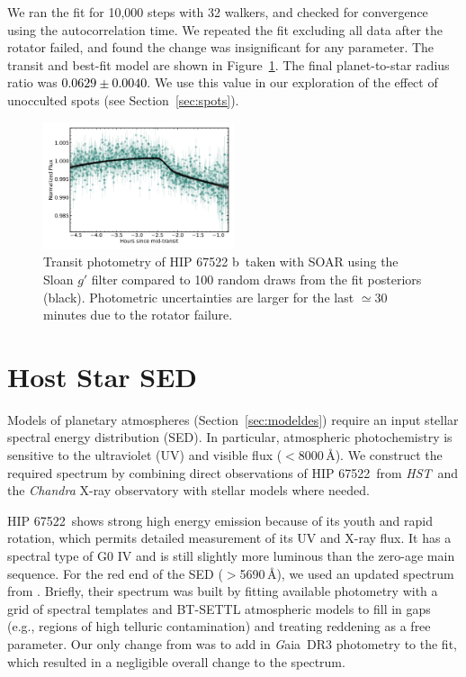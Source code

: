 \documentclass[twocolumn]{aastex63} %
\newcommand{\gaia}{{\textit Gaia}}
\newcommand{\hst}{\textit{HST}}
\newcommand{\plname}{HIP 67522 b}
\newcommand{\starname}{HIP 67522}
\newcommand{\newedit}[1]{\textcolor{black}{#1}}
\begin{document}
We ran the fit for 10,000 steps with 32 walkers, and checked for convergence using the autocorrelation time. We repeated the fit excluding all data after the rotator failed, and found the change was insignificant for any parameter. The transit and best-fit model are shown in Figure~\ref{fig:gtransit}. The final planet-to-star radius ratio was \newedit{$0.0629\pm0.0040$}. We use this value in our exploration of the effect of unocculted spots (see Section~\ref{sec:spots}).

\begin{figure}[ht]
    \centering
    \includegraphics[width=0.50\textwidth]{SOAR_gptransit.pdf}
    \caption{Transit photometry of \plname\, taken with SOAR using the Sloan $g'$ filter compared to 100 random draws from the fit posteriors (black). Photometric uncertainties are larger for the last $\simeq$30\,minutes due to the rotator failure. 
    \label{fig:gtransit}}
\end{figure} 

\section{Host Star SED} \label{sec:sed} 

Models of planetary atmospheres (Section~\ref{sec:modeldes}) require an input stellar spectral energy distribution (SED). In particular, atmospheric photochemistry is sensitive to the ultraviolet (UV) and visible flux ($<8000$\,\AA). We construct the required spectrum by combining direct observations of \starname\ from \hst\ and the \textit{Chandra} X-ray observatory with stellar models where needed. 

\starname\ shows strong high energy emission because of its youth and rapid rotation, which permits detailed measurement of its UV and X-ray flux. It has a spectral type of G0 IV and is still slightly more luminous than the zero-age main sequence. For the red end of the SED ($>$5690\,\AA), we used an updated spectrum from \citet{Rizzuto2020}. Briefly, their spectrum was built by fitting available photometry with a grid of spectral templates and BT-SETTL atmospheric models to fill in gaps (e.g., regions of high telluric contamination) and treating reddening as a free parameter. Our only change from \citet{Rizzuto2020} was to add in \gaia\ DR3 photometry to the fit, which resulted in a negligible overall change to the spectrum.
\end{document}

